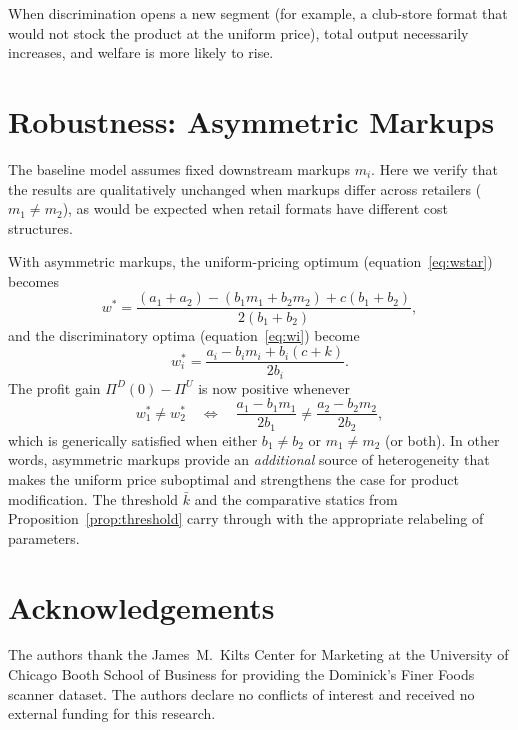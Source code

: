 \documentclass[12pt]{article}
\theoremstyle{definition}
\begin{document}
When discrimination opens a new segment (for example, a club-store format that would not stock the product at the uniform price), total output necessarily increases, and welfare is more likely to rise.

\section{Robustness: Asymmetric Markups}\label{app:robustness}

The baseline model assumes fixed downstream markups $m_i$.
Here we verify that the results are qualitatively unchanged when markups differ across retailers ($m_1 \ne m_2$), as would be expected when retail formats have different cost structures.

With asymmetric markups, the uniform-pricing optimum (equation~\ref{eq:wstar}) becomes
\[
w^* = \frac{(a_1 + a_2) - (b_1 m_1 + b_2 m_2) + c(b_1 + b_2)}{2(b_1 + b_2)},
\]
and the discriminatory optima (equation~\ref{eq:wi}) become
\[
w_i^* = \frac{a_i - b_i m_i + b_i(c+k)}{2b_i}.
\]
The profit gain $\Pi^D(0) - \Pi^U$ is now positive whenever
\[
w_1^* \ne w_2^* \quad\Longleftrightarrow\quad \frac{a_1 - b_1 m_1}{2b_1} \ne \frac{a_2 - b_2 m_2}{2b_2},
\]
which is generically satisfied when either $b_1 \ne b_2$ or $m_1 \ne m_2$ (or both).
In other words, asymmetric markups provide an \textit{additional} source of heterogeneity that makes the uniform price suboptimal and strengthens the case for product modification.
The threshold $\bar{k}$ and the comparative statics from Proposition~\ref{prop:threshold} carry through with the appropriate relabeling of parameters.


\section*{Acknowledgements}

The authors thank the James~M.\ Kilts Center for Marketing at the University of Chicago Booth School of Business for providing the Dominick's Finer Foods scanner dataset. The authors declare no conflicts of interest and received no external funding for this research.
\end{document}
